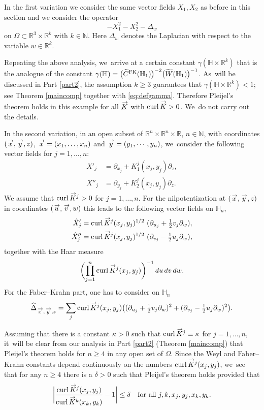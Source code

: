 \documentclass[10pt]{amsart}
\newcommand{\FK}{\textup{FK}}
\DeclareMathOperator{\curl}{curl}
\renewcommand{\vec}[1]
{\overset{\,{\raisebox{-2pt}{$\scriptstyle\to$}}}{#1}}
\theoremstyle{definition}
\newcommand{\1}{\mathbbm{1}}
\newcommand{\N}{\mathbb{N}}
\newcommand{\R}{\mathbb{R}}
\begin{document}
In the first variation we consider the same vector fields $X_1,X_2$ as before in this section and we consider the operator
\[
-X_1^2 - X_2^2 -\Delta_w
\]
on $\Omega \subset \R^3 \times \mathbb R^k$ with $k\in\N$. Here $\Delta_w$ denotes the Laplacian with respect to the variable $w\in\R^k$.

Repeating the above analysis, we~arrive at a certain constant $\gamma (\mathbb H \times \mathbb R^k)$ that is the analogue of the constant $\gamma (\mathbb H) = \bigl(\widetilde C^\FK(\mathbb H_1)\bigr)^{-2} \bigl(\widetilde W (\mathbb H_1)\bigr)^{-1}$. As~will be discussed in Part \ref{part2}, the assumption $k\geq 3$ guarantees that $\gamma (\mathbb H \times \mathbb R^k)<1$; see Theorem \ref{maincomp} together with \eqref{eq:defgamma}. Therefore Pleijel's theorem holds in this example for all $\vec K$ with $\curl\vec K>0$. We~do not carry out the details.

In the second variation, in an open subset of $\R^n\times\R^n\times\R$, $n\in\mathbb N$, with coordinates $(\vec x,\vec y,z)$, $\vec x =(x_1,\dots,x_n)$ and $\vec y=(y_1,\cdots, y_n)$, we~consider the following vector fields for $j=1,\ldots, n$:
\begin{align*}
X'_j&= \partial_{x_j} + K_1^j (x_j,y_j) \partial_z,\\
X''_j& = \partial_{y_j} + K_2^j (x_j,y_j) \partial_z.
\end{align*}
We assume that $\curl \vec K{}^j >0$ for $j=1,\ldots, n$.
For the nilpotentization at $(\vec x,\vec y,z)$ in coordinates $(\vec u,\vec v,w)$ this leads to the following vector fields on $\mathbb H_n$,
\begin{align*}
\hat X'_j & = \curl\vec K{}^j(x_j,y_j)^{1/2} \ (\partial _{u_j} +\tfrac 12 v_j \partial_w),\\
\hat X''_j& = \curl\vec K{}^j(x_j,y_j)^{1/2} \ (\partial _{v_j} - \tfrac 12 u_j \partial_w),
\end{align*}
together with the Haar measure
\[
\biggl(\prod_{j=1}^n \curl \vec K{}^j(x_j,y_j) \biggr)^{-1} \,du\,dv\,dw.
\]
For the Faber--Krahn part, one has to consider on $\mathbb H_n$
\[
\widehat \Delta_{\vec x,\vec y,z}= \sum_j \curl \vec K{}^j(x_j,y_j) \bigl((\partial _{u_j} + \tfrac{ 1}{2} v_j \partial_w)^2+(\partial _{v_j} - \tfrac {1}{2}u_j\partial_w)^2 \bigr).
\]

Assuming that there is a constant $\kappa>0$ such that $\curl \vec K{}^j \equiv \kappa$ for $j=1,\ldots,n$, it~will be clear from our analysis in Part \ref{part2} (Theorem \ref{maincomp}) that Pleijel's theorem holds for $n\geq 4$ in any open set of $\Omega$. Since the Weyl and Faber--Krahn constants depend continuously on the numbers $\curl \vec K{}^j(x_j,y_j)$, we~see that for any $n\geq 4$ there is a $\delta>0$ such that Pleijel's theorem holds provided that
\[
\biggl| \frac{\curl \vec K{}^j(x_j,y_j)}{\curl \vec K{}^k(x_k,y_k)} - 1\biggr| \leq \delta
\quad\text{for all}\ j, k, x_j,y_j, x_k,y_k.
\]
\end{document}
